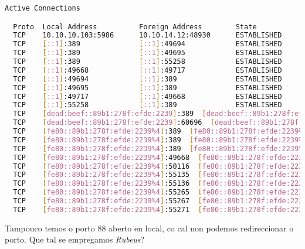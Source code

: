 \documentclass[a4paper]{article}
\begin{document}
\begin{enumerate}[label=(\arabic*)]
\begin{lstlisting}[language=Bash, caption=netstat]
Active Connections

  Proto  Local Address          Foreign Address        State
  TCP    10.10.10.103:5986      10.10.14.12:48930      ESTABLISHED
  TCP    [::1]:389              [::1]:49694            ESTABLISHED
  TCP    [::1]:389              [::1]:49695            ESTABLISHED
  TCP    [::1]:389              [::1]:55258            ESTABLISHED
  TCP    [::1]:49668            [::1]:49717            ESTABLISHED
  TCP    [::1]:49694            [::1]:389              ESTABLISHED
  TCP    [::1]:49695            [::1]:389              ESTABLISHED
  TCP    [::1]:49717            [::1]:49668            ESTABLISHED
  TCP    [::1]:55258            [::1]:389              ESTABLISHED
  TCP    [dead:beef::89b1:278f:efde:2239]:389  [dead:beef::89b1:278f:efde:2239]:60696  ESTABLISHED
  TCP    [dead:beef::89b1:278f:efde:2239]:60696  [dead:beef::89b1:278f:efde:2239]:389  ESTABLISHED
  TCP    [fe80::89b1:278f:efde:2239%4]:389  [fe80::89b1:278f:efde:2239%4]:55265  ESTABLISHED
  TCP    [fe80::89b1:278f:efde:2239%4]:389  [fe80::89b1:278f:efde:2239%4]:55267  ESTABLISHED
  TCP    [fe80::89b1:278f:efde:2239%4]:389  [fe80::89b1:278f:efde:2239%4]:55271  ESTABLISHED
  TCP    [fe80::89b1:278f:efde:2239%4]:49668  [fe80::89b1:278f:efde:2239%4]:50116  ESTABLISHED
  TCP    [fe80::89b1:278f:efde:2239%4]:50116  [fe80::89b1:278f:efde:2239%4]:49668  ESTABLISHED
  TCP    [fe80::89b1:278f:efde:2239%4]:55135  [fe80::89b1:278f:efde:2239%4]:135  TIME_WAIT
  TCP    [fe80::89b1:278f:efde:2239%4]:55136  [fe80::89b1:278f:efde:2239%4]:49668  TIME_WAIT
  TCP    [fe80::89b1:278f:efde:2239%4]:55265  [fe80::89b1:278f:efde:2239%4]:389  ESTABLISHED
  TCP    [fe80::89b1:278f:efde:2239%4]:55267  [fe80::89b1:278f:efde:2239%4]:389  ESTABLISHED
  TCP    [fe80::89b1:278f:efde:2239%4]:55271  [fe80::89b1:278f:efde:2239%4]:389  ESTABLISHED
\end{lstlisting}

Tampouco temos o porto 88 aberto en local, co cal non podemos redireccionar o porto. Que tal se empregamos \textit{Rubeus}?

        \end{enumerate}        

\clearpage
\end{document}
